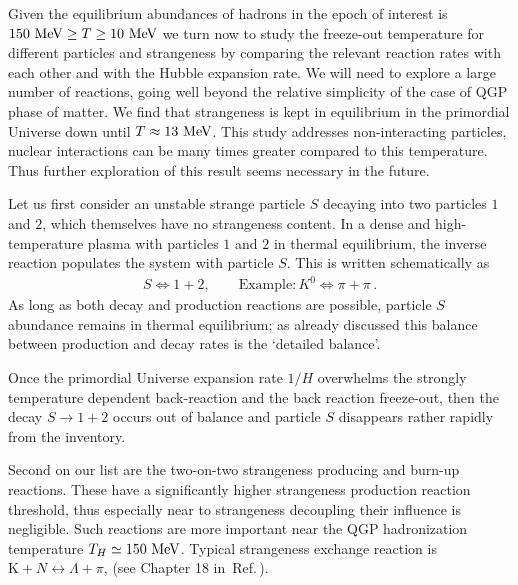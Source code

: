 Given the equilibrium abundances of hadrons in the epoch of interest is $150\text{ MeV}\ge T\ge 10\text{ MeV}$ we turn now to study the freeze-out temperature for different particles and strangeness  by comparing the relevant reaction rates with each other and with the Hubble expansion rate.  We will need to explore a large number of reactions, going well beyond the relative simplicity of the case of QGP phase of matter. We find that strangeness is kept in equilibrium in the primordial Universe down until $T\approx 13\text{ MeV}$. This study addresses non-interacting particles, nuclear interactions can be many times greater compared to this temperature. Thus further exploration of this result seems necessary in the future.

Let us first consider an unstable strange particle $S$ decaying into two particles $1$ and $2$, which themselves have no strangeness content. In a dense and high-temperature plasma with particles $1$ and $2$ in thermal equilibrium, the inverse reaction populates the system with particle $S$. This is written schematically as
\begin{align}
 S\Longleftrightarrow1+2,\qquad \mathrm{Example}: K^0\Longleftrightarrow\pi+\pi\,.
\end{align}
As long as both decay and production reactions are possible, particle $S$ abundance remains in thermal equilibrium; as already discussed this balance between production and decay rates is the `detailed balance'.

Once the primordial Universe expansion rate $1/H$ overwhelms the strongly temperature dependent back-reaction and the back reaction freeze-out, then the decay $S\rightarrow 1+2$ occurs out of balance and particle $S$ disappears rather rapidly from the inventory. 

Second on our list are the two-on-two strangeness producing and burn-up reactions. These have a significantly higher strangeness production reaction threshold, thus especially near to strangeness decoupling their influence is negligible. Such reactions are more important near the QGP hadronization temperature $T_H\simeq 150\text{ MeV}$. Typical  strangeness exchange reaction is $\mathrm{K}+N\leftrightarrow \Lambda+\pi$, (see Chapter 18 in~Ref.\,\cite{Letessier:2002ony}).

